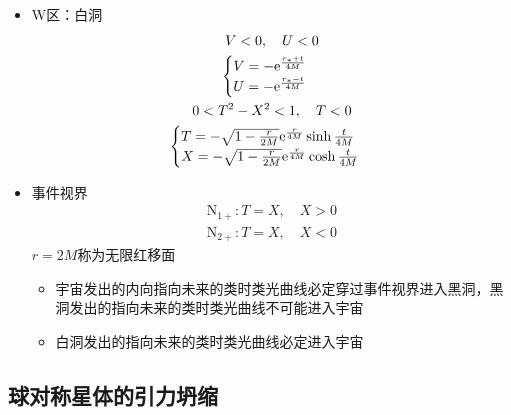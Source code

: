 \begin{itemize}
\begin{gather*}
            \\
            0<T^2-X^2<1,\quad T>0
            \\
            \begin{cases}
                T=\sqrt{1-\frac{r}{2M}}\e^{\frac{r}{4M}}\sinh \frac{t}{4M}
                \\
                X=\sqrt{1-\frac{r}{2M}}\e^{\frac{r}{4M}}\cosh \frac{t}{4M}
            \end{cases}
        \end{gather*}
        \item W区：白洞
        \begin{gather*}
            V<0,\quad U<0
            \\
            \begin{cases}
                V=-\mathrm{e}^{\frac{r_{*}+t}{4M}}
                \\
                U=-\mathrm{e}^{\frac{r_{*}-t}{4M}}
            \end{cases}
            \\
            0<T^2-X^2<1,\quad T<0
            \\
            \begin{cases}
                T=-\sqrt{1-\frac{r}{2M}}\mathrm{e}^{\frac{r}{4M}}\sinh \frac{t}{4M}
                \\
                X=-\sqrt{1-\frac{r}{2M}}\mathrm{e}^{\frac{r}{4M}}\cosh \frac{t}{4M}
            \end{cases}
        \end{gather*}
        \item 事件视界
        \begin{gather*}
            \mathrm{N}_{1+}: T=X,\quad X>0
            \\
            \mathrm{N}_{2+}: T=X,\quad X<0
        \end{gather*}
        $r=2M$称为无限红移面
        \begin{itemize}
            \item 宇宙发出的内向指向未来的类时类光曲线必定穿过事件视界进入黑洞，黑洞发出的指向未来的类时类光曲线不可能进入宇宙
            \item 白洞发出的指向未来的类时类光曲线必定进入宇宙
        \end{itemize}
    \end{itemize}

\subsection{球对称星体的引力坍缩}

